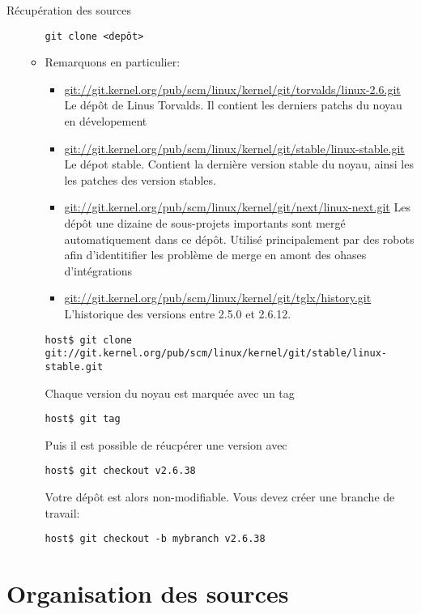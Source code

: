 \begin{frame}[fragile=singleslide]{Récupération des sources}
\begin{enumerate}
\begin{itemize}
      \begin{lstlisting} 
git clone <depôt>
      \end{lstlisting} 
    \item Remarquons en particulier:
      \begin{itemize} 
      \item
        \url{git://git.kernel.org/pub/scm/linux/kernel/git/torvalds/linux-2.6.git}
        Le dépôt de Linus Torvalds. Il contient les derniers patchs du
        noyau en dévelopement
      \item
        \url{git://git.kernel.org/pub/scm/linux/kernel/git/stable/linux-stable.git}
        Le dépot stable. Contient la dernière version stable du noyau,
        ainsi les les patches des version stables.
      \item
        \url{git://git.kernel.org/pub/scm/linux/kernel/git/next/linux-next.git}
        Les dépôt  une dizaine  de sous-projets importants  sont mergé
        automatiquement dans ce  dépôt. Utilisé principalement par des
        robots afin d'identitifier les  problème de merge en amont des
        ohases d'intégrations
      \item
        \url{git://git.kernel.org/pub/scm/linux/kernel/git/tglx/history.git}
        L'historique des versions entre 2.5.0 et 2.6.12.
      \end{itemize} 
      \begin{lstlisting} 
host$ git clone git://git.kernel.org/pub/scm/linux/kernel/git/stable/linux-stable.git
      \end{lstlisting} 
      Chaque version du noyau est marquée avec un tag
      \begin{lstlisting} 
host$ git tag
      \end{lstlisting} 
      Puis il est possible de réucpérer une version avec
      \begin{lstlisting}
host$ git checkout v2.6.38
      \end{lstlisting}
      Votre  dépôt  est alors  non-modifiable.  Vous  devez créer  une
      branche de travail:
      \begin{lstlisting}
host$ git checkout -b mybranch v2.6.38
      \end{lstlisting}
    \end{itemize}  
  \end{enumerate}
\end{frame}

\section{Organisation des sources}

